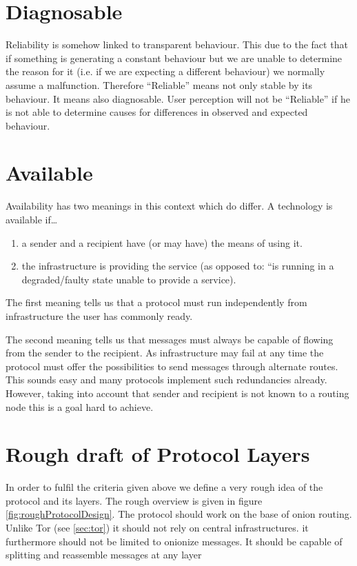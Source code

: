 \section{Diagnosable}
Reliability is somehow linked to transparent behaviour. This due to the fact that if something is generating a constant behaviour but we are unable to determine the reason for it (i.e. if we are expecting a different behaviour) we normally assume a malfunction. Therefore ``Reliable'' means not only stable by its behaviour. It means also diagnosable. User perception will not be ``Reliable'' if he is not able to determine causes for differences in observed and expected behaviour.

\section{Available}
Availability has two meanings in this context which do differ. A technology is available if\ldots
\begin{enumerate}
	\item a sender and a recipient have (or may have) the means of using it.
	\item the infrastructure is providing the service (as opposed to: ``is running in a degraded/faulty state unable to provide a service).
\end{enumerate}

The first meaning tells us that a protocol must run independently from infrastructure the user has commonly ready.

The second meaning tells us that messages must always be capable of flowing from the sender to the recipient. As infrastructure may fail at any time the protocol must offer the possibilities to send messages through alternate routes. This sounds easy and many protocols implement such redundancies already. However, taking into account that sender and recipient is not known to a routing node this is a goal hard to achieve.

\section{Rough draft of Protocol Layers}
In order to fulfil the criteria given above we define a very rough idea of the protocol and its layers. The rough overview is given in figure \ref{fig:roughProtocolDesign}. The protocol should work on the base of onion routing. Unlike Tor (see \ref{sec:tor}) it should not rely on central infrastructures. it furthermore should not be limited to onionize messages. It should be capable of splitting and reassemble messages at any layer 

